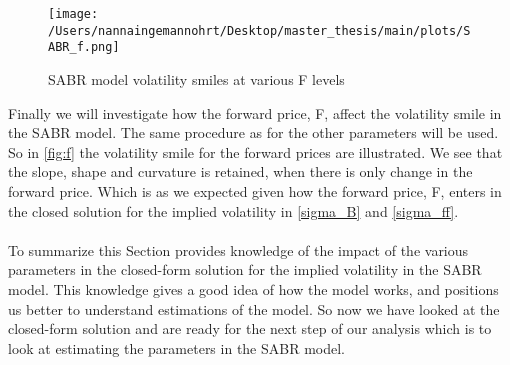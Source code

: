 \begin{figure}[H]
    \centering
    \texttt{[image: /Users/nannaingemannohrt/Desktop/master\_thesis/main/plots/SABR\_f.png]}
    \caption{SABR model volatility smiles at various F levels}
    \label{fig:f}
\end{figure}
\noindent
Finally we will investigate how the forward price, F, affect the volatility smile in the SABR model. 
The same procedure as for the other parameters will be used. So in \autoref{fig:f} the volatility smile
for the forward prices are illustrated. We see that the slope, shape and curvature is retained, when there
is only change in the forward price. Which is as we expected given how the forward price, F, enters in the closed
solution for the implied volatility in \autoref{sigma_B} and \autoref{sigma_ff}.
\\\\
To summarize this Section provides knowledge of the impact of the various parameters in the closed-form solution
for the implied volatility in the SABR model. This knowledge gives a good idea of how the model works, and 
positions us better to understand estimations of the model. So now we have looked at the closed-form solution and 
are ready for the next step of our analysis which is to look at  estimating the parameters in the SABR model.
\newpage
